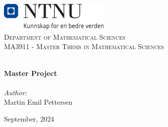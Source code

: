 
\begin{titlepage}
\vbox{ }
\vbox{ }
\begin{center}
\includegraphics[width=0.40\textwidth]{Images/NTNU_logo.png}\\[1cm]
\textsc{\LARGE  Department of Mathematical Sciences}\\[1.5cm]
\textsc{\Large MA3911 - Master Thesis in Mathematical Sciences }\\[0.5cm]
\vbox{ }

\HRule \\[0.4cm]
{ \huge \bfseries Master Project}\\[0.4cm]
\HRule \\[1.5cm]

\large
\emph{Author:}\\
Martin Emil Pettersen
\vfill

{\large September, 2024}
\end{center}
\end{titlepage}